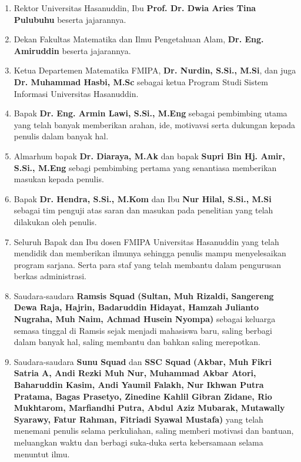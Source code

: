 \begin{enumerate}[topsep=0pt,itemsep=0pt,partopsep=0pt, parsep=0pt]
    \item Rektor Universitas Hasanuddin, Ibu \textbf{Prof. Dr. Dwia Aries Tina Pulubuhu} beserta jajarannya.
    \item Dekan Fakultas Matematika dan Ilmu Pengetahuan Alam, \textbf{Dr. Eng. Amiruddin} beserta jajarannya.
    \item Ketua Departemen Matematika FMIPA, \textbf{Dr. Nurdin, S.Si., M.Si}, dan juga \textbf{Dr. Muhammad Hasbi, M.Sc} sebagai ketua Program Studi Sistem Informasi Universitas Hasanuddin.
    \item Bapak \textbf{Dr. Eng. Armin Lawi, S.Si., M.Eng} sebagai pembimbing utama yang telah banyak memberikan arahan, ide, motivavsi serta dukungan kepada penulis dalam banyak hal.
    \item Almarhum bapak \textbf{Dr. Diaraya, M.Ak} dan bapak \textbf{Supri Bin Hj. Amir, S.Si., M.Eng} sebagi pembimbing pertama yang senantiasa  memberikan masukan kepada penulis.
    \item Bapak \textbf{Dr. Hendra, S.Si., M.Kom} dan Ibu \textbf{Nur Hilal, S.Si., M.Si} sebagai tim penguji atas saran dan masukan pada penelitian yang telah dilakukan oleh penulis.
    \item Seluruh Bapak dan Ibu dosen FMIPA Universitas Hasanuddin yang telah mendidik dan memberikan ilmunya sehingga penulis mampu menyelesaikan program sarjana. Serta para staf yang telah membantu dalam pengurusan berkas administrasi.

    \item Saudara-saudara \textbf{Ramsis Squad} \textbf{(Sultan, Muh Rizaldi, Sangereng Dewa Raja, Hajrin, Badaruddin Hidayat, Hamzah Julianto Nugraha, Muh Naim, Achmad Husein Nyompa)} sebagai keluarga semasa tinggal di Ramsis sejak menjadi mahasiswa baru, saling berbagi dalam banyak hal, saling membantu dan bahkan saling merepotkan.

    \item Saudara-saudara \textbf{Sunu Squad} dan \textbf{SSC Squad} \textbf{(Akbar, Muh Fikri Satria A, Andi Rezki Muh Nur, Muhammad Akbar Atori, Baharuddin Kasim, Andi Yaumil Falakh, Nur Ikhwan Putra Pratama, Bagas Prasetyo, Zinedine Kahlil Gibran Zidane, Rio Mukhtarom, Marfiandhi Putra, Abdul Aziz Mubarak,  Mutawally Syarawy, Fatur Rahman, Fitriadi Syawal Mustafa)} yang telah menemani penulis selama perkuliahan, saling memberi motivasi dan bantuan, meluangkan waktu dan berbagi suka-duka serta kebersamaan selama menuntut ilmu.


\end{enumerate}
